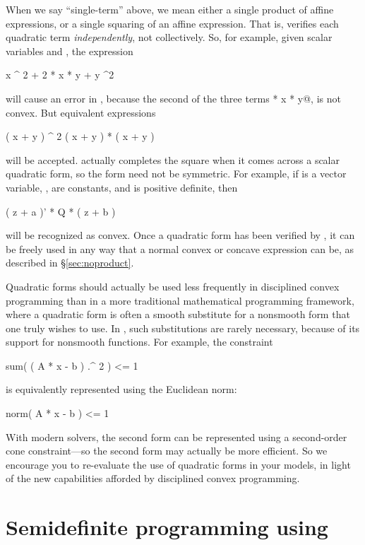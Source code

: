 \documentclass[12pt]{article}
\begin{document}
When we say ``single-term'' above, we mean either a single product of
affine expressions, or
a single squaring of an affine expression. That is, \cvx
verifies each quadratic term \emph{independently}, not collectively.
So, for example, given scalar variables \verb@x@ and \verb@y@,
the expression
\begin{code}
	x ^ 2 + 2 * x * y + y ^2
\end{code}
will cause an error in \cvx, because the second of the three terms
 * x * y@, is not convex. But equivalent expressions
\begin{code}
	( x + y ) ^ 2
	( x + y ) * ( x + y )
\end{code}
will be accepted. \cvx actually completes the
square when it comes across a scalar quadratic form, so the form
need not be symmetric. For example,
if \verb@z@ is a vector variable, \verb@a@, \verb@b@ are constants,
and \verb@Q@ is positive definite, then
\begin{code}
	( z + a )' * Q * ( z + b )
\end{code}
will be recognized as convex. Once a quadratic form has been verified by \cvx,
it can be freely
used in any way that a normal convex or concave expression can be,
as described in \S\ref{sec:noproduct}.

Quadratic forms should actually be used less
frequently in disciplined convex programming
than in a more traditional mathematical programming framework,
where a quadratic form is often a smooth substitute 
for a nonsmooth form that one truly wishes to use. In
\cvx, such substitutions are rarely necessary, because of its support
for nonsmooth functions. For example,
the constraint
\begin{code}
	sum( ( A * x - b ) .^ 2 ) <= 1
\end{code}
is equivalently represented using the Euclidean norm:
\begin{code}
	norm( A * x - b ) <= 1
\end{code}
With modern solvers, the second form can be represented using a second-order cone
constraint---so the second form may actually be more efficient. So we encourage
you to re-evaluate the use of quadratic forms in your models, in light of the
new capabilities afforded by disciplined convex programming.

\section{Semidefinite programming using \cvx}
\label{sec:sdpmode}
\end{document}
